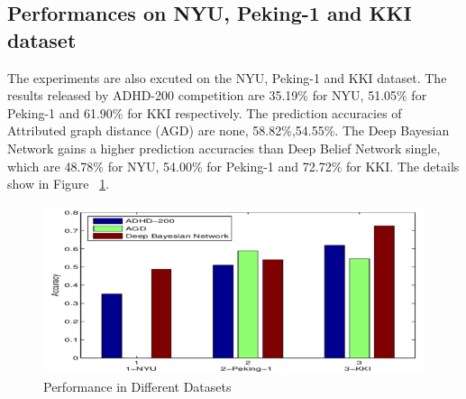 \documentclass{article}
\begin{document}
%    




\subsection{Performances on NYU, Peking-1 and KKI dataset}
The experiments are also excuted on the NYU, Peking-1 and KKI dataset. The results released by ADHD-200 competition are 35.19\% for NYU, 51.05\% for Peking-1 and 61.90\% for KKI respectively. The prediction accuracies of Attributed graph distance\cite{19} (AGD) are none, 58.82\%,54.55\%. The Deep Bayesian Network  gains a higher prediction accuracies than Deep Belief Network single, which are 48.78\% for NYU, 54.00\% for Peking-1 and 72.72\% for KKI. The details show in Figure ~\ref{fig:dataset}.
\begin{figure}[ht]
\begin{center}
   \includegraphics[width=0.8\linewidth]{Figures/Datasets.png}
\end{center}
   \caption{Performance in Different Datasets}
\label{fig:dataset}
\end{figure}
\end{document}
